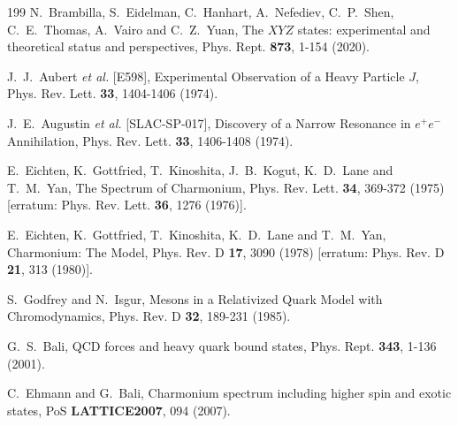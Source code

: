 \documentclass[final,5p,times,twocolumn]{elsarticle}
\begin{document}
\begin{thebibliography}{199}
N.~Brambilla, S.~Eidelman, C.~Hanhart, A.~Nefediev, C.~P.~Shen, C.~E.~Thomas, A.~Vairo and C.~Z.~Yuan,
The $XYZ$ states: experimental and theoretical status and perspectives,
Phys. Rept. \textbf{873}, 1-154 (2020).


J.~J.~Aubert \textit{et al.} [E598],
Experimental Observation of a Heavy Particle $J$,
Phys. Rev. Lett. \textbf{33}, 1404-1406 (1974).

J.~E.~Augustin \textit{et al.} [SLAC-SP-017],
Discovery of a Narrow Resonance in $e^+ e^-$ Annihilation,
Phys. Rev. Lett. \textbf{33}, 1406-1408 (1974).


E.~Eichten, K.~Gottfried, T.~Kinoshita, J.~B.~Kogut, K.~D.~Lane and T.~M.~Yan,
The Spectrum of Charmonium,
Phys. Rev. Lett. \textbf{34}, 369-372 (1975)
[erratum: Phys. Rev. Lett. \textbf{36}, 1276 (1976)].


E.~Eichten, K.~Gottfried, T.~Kinoshita, K.~D.~Lane and T.~M.~Yan,
Charmonium: The Model,
Phys. Rev. D \textbf{17}, 3090 (1978)
[erratum: Phys. Rev. D \textbf{21}, 313 (1980)].


S.~Godfrey and N.~Isgur,
Mesons in a Relativized Quark Model with Chromodynamics,
Phys. Rev. D \textbf{32}, 189-231 (1985).


G.~S.~Bali,
QCD forces and heavy quark bound states,
Phys. Rept. \textbf{343}, 1-136 (2001).

C.~Ehmann and G.~Bali,
Charmonium spectrum including higher spin and exotic states,
PoS \textbf{LATTICE2007}, 094 (2007).



\end{thebibliography}
\end{document}
